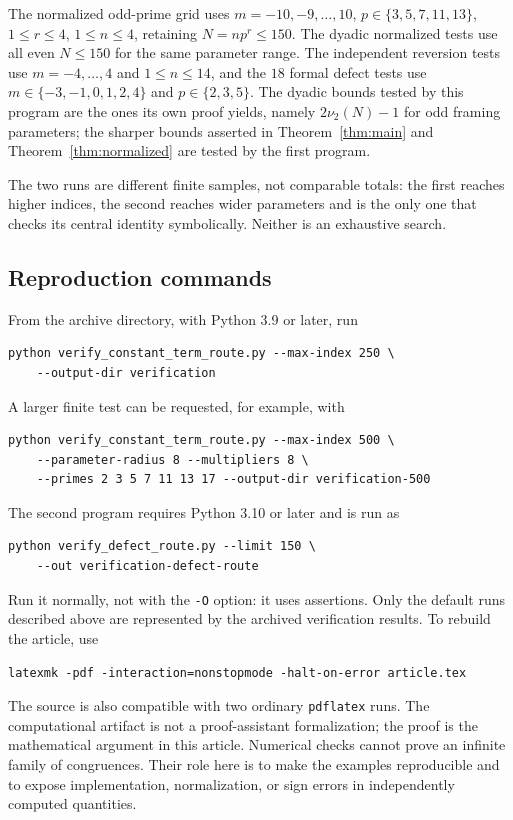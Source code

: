 \documentclass[11pt,letterpaper]{article}
\numberwithin{equation}{section}
\theoremstyle{definition}
\begin{document}
The normalized odd-prime grid uses $m=-10,-9,\ldots,10$,
$p\in\{3,5,7,11,13\}$, $1\leq r\leq4$, $1\leq n\leq4$, retaining
$N=np^r\leq150$. The dyadic normalized tests use all even $N\leq150$ for
the same parameter range. The independent reversion tests use
$m=-4,\ldots,4$ and $1\leq n\leq14$, and the $18$ formal defect tests use
$m\in\{-3,-1,0,1,2,4\}$ and $p\in\{2,3,5\}$. The dyadic bounds tested by
this program are the ones its own proof yields, namely
$2\nu_2(N)-1$ for odd framing parameters; the sharper bounds asserted in
Theorem~\ref{thm:main} and Theorem~\ref{thm:normalized} are tested by the
first program.

The two runs are different finite samples, not comparable totals: the
first reaches higher indices, the second reaches wider parameters and is
the only one that checks its central identity symbolically. Neither is an
exhaustive search.

\subsection{Reproduction commands}

From the archive directory, with Python 3.9 or later, run
\begin{lstlisting}
python verify_constant_term_route.py --max-index 250 \
    --output-dir verification
\end{lstlisting}
A larger finite test can be requested, for example, with
\begin{lstlisting}
python verify_constant_term_route.py --max-index 500 \
    --parameter-radius 8 --multipliers 8 \
    --primes 2 3 5 7 11 13 17 --output-dir verification-500
\end{lstlisting}
The second program requires Python 3.10 or later and is run as
\begin{lstlisting}
python verify_defect_route.py --limit 150 \
    --out verification-defect-route
\end{lstlisting}
Run it normally, not with the \texttt{-O} option: it uses assertions.
Only the default runs described above are represented by the archived
verification results. To rebuild the article, use
\begin{lstlisting}
latexmk -pdf -interaction=nonstopmode -halt-on-error article.tex
\end{lstlisting}
The source is also compatible with two ordinary \texttt{pdflatex} runs.
The computational artifact is not a proof-assistant formalization; the
proof is the mathematical argument in this article.
Numerical checks cannot prove an infinite family of congruences. Their
role here is to make the examples reproducible and to expose
implementation, normalization, or sign errors in independently computed
quantities.
\end{document}
